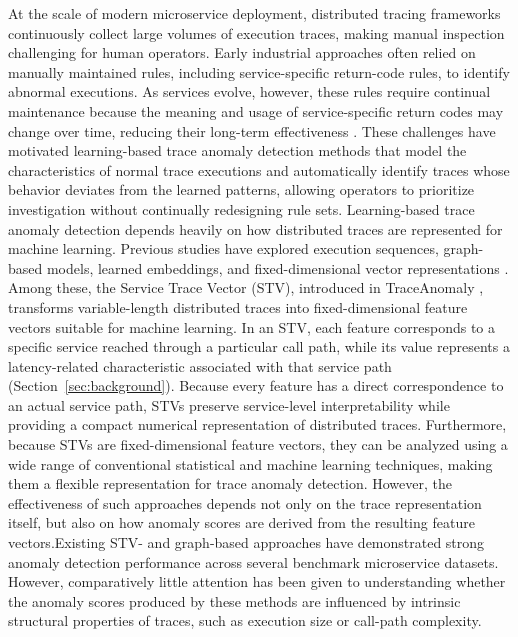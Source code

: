 At the scale of modern microservice deployment, distributed tracing
frameworks continuously collect large volumes of execution traces,
making manual inspection challenging for human operators. Early
industrial approaches often relied on manually maintained rules,
including service-specific return-code rules, to identify abnormal
executions. As services evolve, however, these rules require continual
maintenance because the meaning and usage of service-specific return
codes may change over time, reducing their long-term effectiveness
\cite{liu2020traceanomaly}. These challenges have motivated
learning-based trace anomaly detection methods that model the
characteristics of normal trace executions and automatically identify
traces whose behavior deviates from the learned patterns, allowing
operators to prioritize investigation without continually redesigning
rule sets. 
Learning-based trace anomaly detection depends heavily on how
distributed traces are represented for machine learning. Previous
studies have explored execution sequences, graph-based models,
learned embeddings, and fixed-dimensional vector representations \cite{liu2020traceanomaly,zhang2022deeptralog,xie2023tracevae}. Among these, the Service Trace Vector (STV), introduced in
TraceAnomaly \cite{liu2020traceanomaly}, transforms variable-length
distributed traces into fixed-dimensional feature vectors suitable for
machine learning. In an STV, each feature corresponds to a specific
service reached through a particular call path, while its value
represents a latency-related characteristic associated with that
service path (Section~\ref{sec:background}). Because every feature has
a direct correspondence to an actual service path, STVs preserve
service-level interpretability while providing a compact numerical
representation of distributed traces. Furthermore, because STVs are
fixed-dimensional feature vectors, they can be analyzed using a wide
range of conventional statistical and machine learning techniques,
making them a flexible representation for trace anomaly detection.
However, the effectiveness of such approaches depends not only on the
trace representation itself, but also on how anomaly scores are
derived from the resulting feature vectors.Existing STV- and graph-based approaches have demonstrated strong anomaly detection performance across several benchmark microservice datasets. However, comparatively little attention has been given to understanding whether the anomaly scores produced by these methods are influenced by intrinsic structural properties of traces, such as execution size or call-path complexity.


